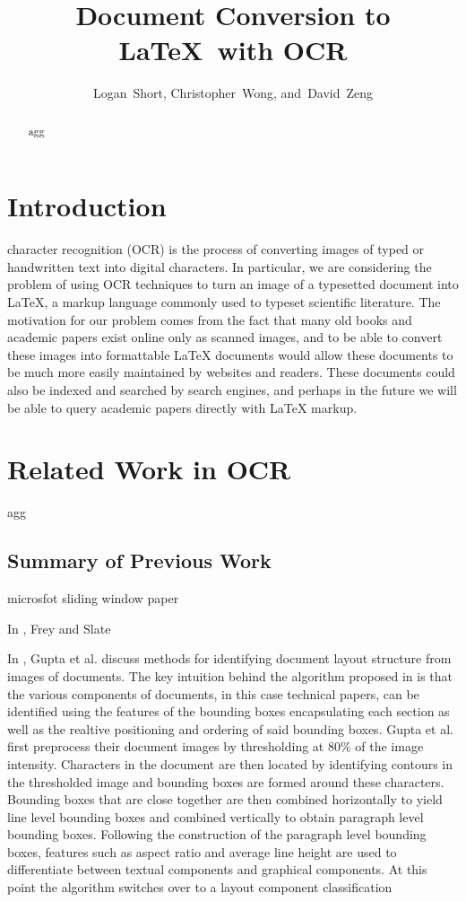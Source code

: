 \documentclass[12pt]{IEEEtran}
\newcommand{\latex}{\LaTeX\xspace}
\begin{document}
\title{Document Conversion to \latex\ with OCR}
\author{Logan~Short, Christopher~Wong, and~David~Zeng}%
\maketitle

\begin{abstract}
agg
\end{abstract}

\section{Introduction}

 character recognition (OCR) is the process of converting images of typed or handwritten text into digital characters. In particular, we are considering the problem of using OCR techniques to turn an image of a typesetted document into \latex, a markup language commonly used to typeset scientific literature. The motivation for our problem comes from the fact that many old books and academic papers exist online only as scanned images, and to be able to convert these images into formattable \latex documents would allow these documents to be much more easily maintained by websites and readers. These documents could also be indexed and searched by search engines, and perhaps in the future we will be able to query academic papers directly with \latex markup.

\section{Related Work in OCR}

agg

\subsection{Summary of Previous Work}

microsfot sliding window paper

In \cite{2}, Frey and Slate

In \cite{3}, Gupta et al. discuss methods for identifying document layout structure from images of documents. The key intuition behind the algorithm proposed in \cite{3} is that the various components of documents, in this case technical papers, can be identified using the features of the bounding boxes encapsulating each section as well as the realtive positioning and ordering of said bounding boxes. Gupta et al. first preprocess their document images by thresholding at 80\% of the image intensity. Characters in the document are then located by identifying contours in the thresholded image and bounding boxes are formed around these characters. Bounding boxes that are close together are then combined horizontally to yield line level bounding boxes and combined vertically to obtain paragraph level bounding boxes. Following the construction of the paragraph level bounding boxes, features such as aspect ratio and average line height are used to differentiate between textual components and graphical components. At this point the algorithm switches over to a layout component classification
\end{document}
